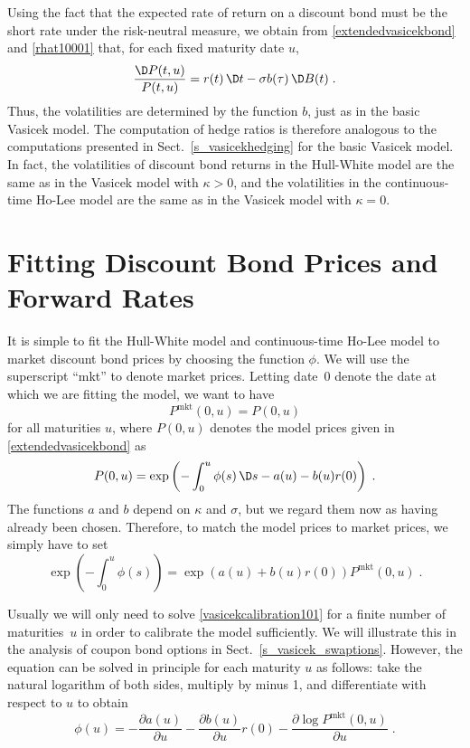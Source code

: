 Using the fact that the expected rate of return on a discount bond must be the short rate under the risk-neutral measure, we obtain from  \eqref{extendedvasicekbond} and  \eqref{rhat10001} that, for each fixed maturity date $u$,
\begin{equation}\label{extendedvasicekbondreturn}
\frac{\D P(t,u)}{P(t,u)} = r(t)\,\D t - \sigma b(\tau)\,\D B(t)\;.
\end{equation}
Thus, the volatilities are determined by the function $b$, just as in the basic Vasicek model.  The computation of hedge ratios is therefore analogous to the computations presented in Sect.~\ref{s_vasicekhedging} for the basic Vasicek model.  In fact, the volatilities of discount bond returns in the  Hull-White model are the same as in the Vasicek model with $\kappa>0$, and the volatilities in the continuous-time Ho-Lee model are the same as in the Vasicek model with $\kappa=0$.  





\section{Fitting Discount Bond Prices and Forward Rates}\label{s_vasicek_fitting}

It is simple to fit the Hull-White model and continuous-time Ho-Lee model to market discount bond prices  by choosing the function $\phi$.  We will use the superscript ``mkt'' to denote market prices.  Letting date~0 denote the date at which we are fitting the model, we want to have
$$P^{\text{mkt}}(0,u) = P(0,u)$$
for all maturities $u$, where $P(0,u)$ denotes the model prices given in  \eqref{extendedvasicekbond} as
$$P(0,u) = \exp\left(-\int_0^u \phi(s)\,\D s-a(u)-b(u)r(0)\right)\; .$$
The functions $a$ and $b$ depend on $\kappa$ and $\sigma$, but we regard them now as having already been chosen.  Therefore, to match the model prices to market prices, we simply have to set
\begin{equation}\label{vasicekcalibration101}
\exp\left(-\int_0^u \phi(s)\right) = \exp\left(a(u)+b(u)r(0)\right)P^{\text{mkt}}(0,u)\;.
\end{equation}

Usually  we will only need to solve  \eqref{vasicekcalibration101} for a finite number of maturities~$u$ in order to calibrate the model sufficiently.  We will illustrate this in the analysis of coupon bond options in Sect.~\ref{s_vasicek_swaptions}.  However, the equation can be solved in principle for each maturity $u$ as follows:  take the natural logarithm of both sides, multiply by minus 1, and differentiate with respect to $u$ to obtain
\begin{equation}\label{extendedvasicekforwards1}
\phi(u) = -\frac{\partial a(u)}{\partial u} - \frac{\partial b(u)}{\partial u}r(0) - \frac{ \partial \log P^{\text{mkt}}(0,u)}{\partial u}\;.
\end{equation}



